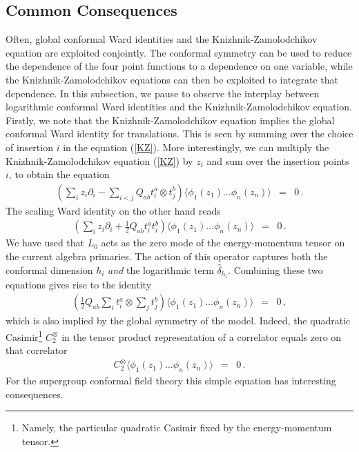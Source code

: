 \documentclass[12pt]{article}
\numberwithin{equation}{section}
\numberwithin{equation}{section}
\numberwithin{table}{section}\setlength{\multlinegap}{25pt}
\begin{document}
\subsection{Common Consequences}
Often, global conformal Ward identities and the Knizhnik-Zamolodchikov equation are exploited conjointly. The conformal symmetry
can be used to reduce the dependence of the four point functions to a dependence on one variable, while the Knizhnik-Zamolodchikov equations can then
be exploited to integrate that dependence. In this subsection,
we pause to observe the interplay between logarithmic conformal Ward identities and the Knizhnik-Zamolodchikov equation.
Firstly, we note that the Knizhnik-Zamolodchikov equation implies the global conformal Ward identity for translations.
This is seen by summing over the choice of insertion $i$ in the equation (\ref{KZ}).
More interestingly, we can multiply the Knizhnik-Zamolodchikov equation (\ref{KZ}) by $z_i$ and sum over the insertion points $i$,
to obtain the equation
\begin{eqnarray}
(\sum_i z_i \partial_i - \sum_{i < j} Q_{ab}  t^a_i \otimes t^b_j) \langle  \phi_1(z_1) \dots \phi_n(z_n)  \rangle &=& 0
\, .
\end{eqnarray}
The scaling Ward identity on the other hand reads
\begin{eqnarray}
(\sum_i z_i \partial_i + \frac{1}{2} Q_{ab} t^a_i t^b_i %
) \langle \phi_1(z_1) \dots \phi_n(z_n) \rangle &=& 0 \, .
\end{eqnarray}
We have used that $L_0$ acts as the zero mode of the energy-momentum tensor on the current algebra primaries. The action of this operator
captures both the conformal dimension $h_i$ {\em and} the logarithmic term $\hat{\delta}_{h_i}$.
Combining these two equations gives rise to the identity
\begin{eqnarray}
(\frac{1}{2} Q_{ab} \sum_i t^a_i \otimes \sum_j t^b_j 
) \langle  \phi_1(z_1) \dots \phi_n(z_n)  \rangle &=& 0 \, ,
\end{eqnarray}
which is also implied by the global symmetry of the model.
Indeed, the quadratic Casimir\footnote{Namely, the particular quadratic Casimir fixed by the energy-momentum tensor.}
 $C_2^\otimes$ in the tensor product representation of a correlator
equals zero on that correlator
\begin{eqnarray}
C^\otimes_2 
\langle  \phi_1(z_1) \dots \phi_n(z_n) \rangle &=& 0 \, .
\end{eqnarray}
For the supergroup conformal field theory this simple equation has interesting consequences.
\end{document}
